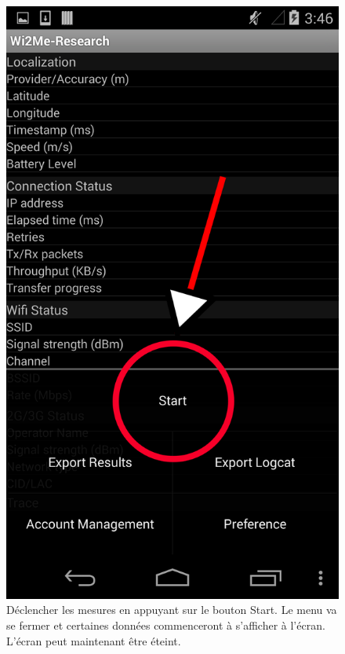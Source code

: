 \documentclass[11pt]{article}
\newcommand\mtext[2]{#1}
\newcommand\mtext[2]{#2}
\begin{document}
\begin{figure}
  \centering
  \caption{\mtext{Déclencher les mesures en appuyant sur le bouton Start. Le menu va se fermer et certaines données commenceront à s'afficher à l'écran. L'écran peut maintenant être éteint.}{Trigger the mesurements by pressing the start button in the menu. The overlay menu will close and some information will start being displayed on screen. The phone's screen can now be turned off to save battery.}}
  \includegraphics[height=0.4\textheight]{start.png}
\end{figure}
\clearpage
\end{document}
